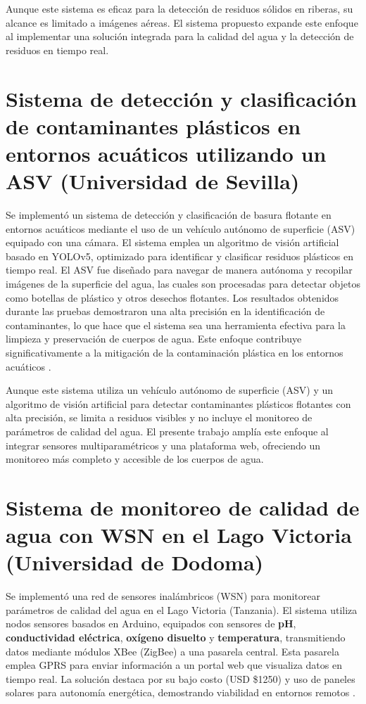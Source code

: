Aunque este sistema es eficaz para la detección de residuos sólidos en riberas, su alcance es limitado a imágenes aéreas. El sistema propuesto expande este enfoque al implementar una solución integrada para la calidad del agua y la detección de residuos en tiempo real.

\section{Sistema de detección y clasificación de contaminantes plásticos en entornos acuáticos utilizando un ASV (Universidad de Sevilla)}

Se implementó un sistema de detección y clasificación de basura flotante en entornos acuáticos mediante el uso de un vehículo autónomo de superficie (ASV) equipado con una cámara. El sistema emplea un algoritmo de visión artificial basado en YOLOv5, optimizado para identificar y clasificar residuos plásticos en tiempo real. El ASV fue diseñado para navegar de manera autónoma y recopilar imágenes de la superficie del agua, las cuales son procesadas para detectar objetos como botellas de plástico y otros desechos flotantes. Los resultados obtenidos durante las pruebas demostraron una alta precisión en la identificación de contaminantes, lo que hace que el sistema sea una herramienta efectiva para la limpieza y preservación de cuerpos de agua. Este enfoque contribuye significativamente a la mitigación de la contaminación plástica en los entornos acuáticos \cite{fernandez2024}.

Aunque este sistema utiliza un vehículo autónomo de superficie (ASV) y un algoritmo de visión artificial para detectar contaminantes plásticos flotantes con alta precisión, se limita a residuos visibles y no incluye el monitoreo de parámetros de calidad del agua. El presente trabajo amplía este enfoque al integrar sensores multiparamétricos y una plataforma web, ofreciendo un monitoreo más completo y accesible de los cuerpos de agua.

\section{Sistema de monitoreo de calidad de agua con WSN en el Lago Victoria (Universidad de Dodoma)}  

Se implementó una red de sensores inalámbricos (WSN) para monitorear parámetros de calidad del agua en el Lago Victoria (Tanzania). El sistema utiliza nodos sensores basados en Arduino, equipados con sensores de \textbf{pH}, \textbf{conductividad eléctrica}, \textbf{oxígeno disuelto} y \textbf{temperatura}, transmitiendo datos mediante módulos XBee (ZigBee) a una pasarela central. Esta pasarela emplea GPRS para enviar información a un portal web que visualiza datos en tiempo real. La solución destaca por su bajo costo (USD \$1250) y uso de paneles solares para autonomía energética, demostrando viabilidad en entornos remotos \cite{faustine2014}.


